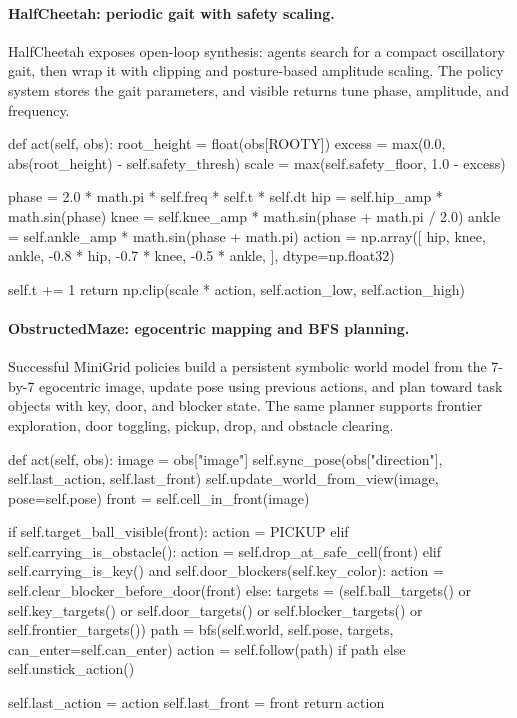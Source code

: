 \paragraph{HalfCheetah: periodic gait with safety scaling.}
HalfCheetah exposes open-loop synthesis: agents search for a compact
oscillatory gait, then wrap it with clipping and posture-based amplitude
scaling. The policy system stores the gait parameters, and visible returns
tune phase, amplitude, and frequency.
\begin{strategycode}
def act(self, obs):
    root_height = float(obs[ROOTY])
    excess = max(0.0, abs(root_height) - self.safety_thresh)
    scale = max(self.safety_floor, 1.0 - excess)

    phase = 2.0 * math.pi * self.freq * self.t * self.dt
    hip = self.hip_amp * math.sin(phase)
    knee = self.knee_amp * math.sin(phase + math.pi / 2.0)
    ankle = self.ankle_amp * math.sin(phase + math.pi)
    action = np.array([
        hip,
        knee,
        ankle,
        -0.8 * hip,
        -0.7 * knee,
        -0.5 * ankle,
    ], dtype=np.float32)

    self.t += 1
    return np.clip(scale * action, self.action_low, self.action_high)
\end{strategycode}

\paragraph{ObstructedMaze: egocentric mapping and BFS planning.}
Successful MiniGrid policies build a persistent symbolic world model from the
7-by-7 egocentric image, update pose using previous actions, and plan toward
task objects with key, door, and blocker state. The same planner supports
frontier exploration, door toggling, pickup, drop, and obstacle clearing.
\begin{strategycode}
def act(self, obs):
    image = obs["image"]
    self.sync_pose(obs["direction"], self.last_action, self.last_front)
    self.update_world_from_view(image, pose=self.pose)
    front = self.cell_in_front(image)

    if self.target_ball_visible(front):
        action = PICKUP
    elif self.carrying_is_obstacle():
        action = self.drop_at_safe_cell(front)
    elif self.carrying_is_key() and self.door_blockers(self.key_color):
        action = self.clear_blocker_before_door(front)
    else:
        targets = (self.ball_targets() or self.key_targets()
                   or self.door_targets() or self.blocker_targets()
                   or self.frontier_targets())
        path = bfs(self.world, self.pose, targets, can_enter=self.can_enter)
        action = self.follow(path) if path else self.unstick_action()

    self.last_action = action
    self.last_front = front
    return action
\end{strategycode}

